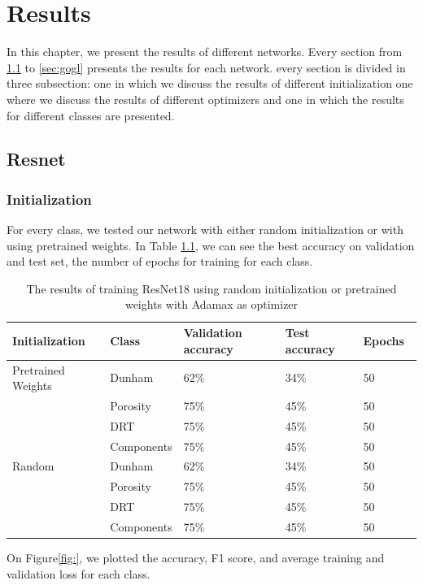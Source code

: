 \chapter{Results}\label{chp:results}

In this chapter, we present the results of different networks. Every section from \ref{sec:res} to \ref{sec:gogl} presents the results for each network. every section is divided in three subsection: one in which we discuss the results of different initialization one where we discuss the results of different optimizers and one in which the results for different classes are presented. 
\section{Resnet}\label{sec:res}
\subsection{Initialization}
For every class, we tested our network with either random initialization or with using pretrained weights. In Table \ref{tab:resinit}, we can see the best accuracy on validation and test set, the number of epochs for training for each class.  

\begin{table}
\caption{\label{tab:resinit} The results of training ResNet18 using random initialization or pretrained weights with Adamax as optimizer}
\centering
\begin{tabular}[b]{| l | l | l | l | l |}
\hline
    Initialization & Class & Validation accuracy & Test accuracy & Epochs\ \\ \hline
    \multirow{}{}{Pretrained Weights} & Dunham &  62\% & 34\% & 50 \\ 
    & Porosity & 75\% & 45\% &  50 \\
    &DRT & 75\% & 45\% &  50 \\
    &Components & 75\% & 45\% &  50 \\ \hline
     \multirow{}{}{Random} & Dunham &  62\% & 34\% & 50 \\
    & Porosity & 75\% & 45\% &  50 \\
    &DRT & 75\% & 45\% &  50 \\
    &Components & 75\% & 45\% &  50 \\ \hline
    
\end{tabular} 
\end{table}
On Figure\ref{fig:}, we plotted the accuracy, F1 score, and average training and validation loss for each class. 



